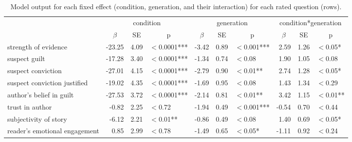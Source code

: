 \documentclass[10pt,letterpaper]{article}
\begin{document}
	\begin{table}
		\centering
		\caption{Model output for each fixed effect (condition, generation, and their interaction) for each rated question (rows).}
		\vskip 0.12in
		\begin{tabular}{l r r l r r l r r l }
			\toprule
			& \multicolumn{3}{c}{condition} & \multicolumn{3}{c}{generation} & \multicolumn{3}{c}{condition*generation} \\
			& \multicolumn{1}{c}{$\beta$} & \multicolumn{1}{c}{SE} & \multicolumn{1}{c}{p} & \multicolumn{1}{c}{$\beta$} & \multicolumn{1}{c}{SE} & \multicolumn{1}{c}{p} & \multicolumn{1}{c}{$\beta$} & \multicolumn{1}{c}{SE} & \multicolumn{1}{c}{p}\\
			\midrule
			strength of evidence    & -23.25 & 4.09 & $<$0.0001***        & -3.42 & 0.89 & $<$0.001*** & 2.59  & 1.26 & $<$0.05*\\
			suspect guilt          & -17.28  & 3.40 & $<$0.0001***              & -1.34 & 0.74 & $<$0.08           & 1.90  & 1.05 & $<$0.08\\
			suspect conviction   & -27.01 & 4.15  & $<$0.0001***            & -2.79 & 0.90 & $<$0.01**     & 2.74  & 1.28 & $<$0.05*\\
			suspect conviction justified    & -19.02 & 4.35 & $<$0.0001***  & -1.69 & 0.95 & $<$0.08      & 1.43 & 1.34 & $<$0.29\\
			author's belief in guilt     & -27.53 & 3.72 & $<$0.0001***     & -2.14 & 0.81 & $<$0.01**      & 3.42  & 1.15 & $<$0.01**\\
			trust in author           & -0.82   & 2.25 & $<$0.72                  & -1.94 & 0.49 & $<$0.001*** & -0.54 & 0.70 & $<$0.44 \\
			subjectivity of story  & -6.12   & 2.21 & $<$0.01**                 & -0.86 & 0.49 & $<$0.08         & 1.40   & 0.69 & $<$0.05*\\
			reader's emotional engagement  & 0.85   & 2.99 & $<$0.78   & -1.49 & 0.65 & $<$0.05*     & -1.11  & 0.92 & $<$0.24\\
					\bottomrule
		\end{tabular}
		\label{tab:exp2results}
	\end{table}
\end{document}

